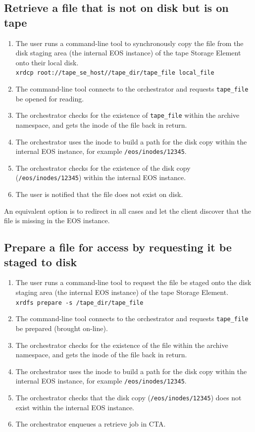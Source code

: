 \documentclass{article}
\begin{document}
\subsection{Retrieve a file that is not on disk but is on tape}
\begin{enumerate}
	\item The user runs a command-line tool to synchronously copy the file from the disk staging area (the internal EOS instance) of the tape Storage Element onto their local disk.\\
	\texttt{xrdcp root://tape\_se\_host//tape\_dir/tape\_file local\_file}
	\item The command-line tool connects to the orchestrator and requests \texttt{tape\_file} be opened for reading.
	\item The orchestrator checks for the existence of \texttt{tape\_file} within the archive namespace, and gets the inode of the file back in return.
	\item The orchestrator uses the inode to build a path for the disk copy within the internal EOS instance, for example \texttt{/eos/inodes/12345}.
	\item The orchestrator checks for the existence of the disk copy (\texttt{/eos/inodes/12345}) within the internal EOS instance.
	\item The user is notified that the file does not exist on disk.
\end{enumerate}

An equivalent option is to redirect in all cases and let the client discover that the file is missing in the EOS instance.

\subsection{Prepare a file for access by requesting it be staged to disk}
\begin{enumerate}
	\item The user runs a command-line tool to request the file be staged onto the disk staging area (the internal EOS instance) of the tape Storage Element. \\
	\texttt{xrdfs prepare -s /tape\_dir/tape\_file}
	\item The command-line tool connects to the orchestrator and requests \texttt{tape\_file} be prepared (brought on-line).
	\item The orchestrator checks for the existence of the file within the archive namespace, and gets the inode of the file back in return.
	\item The orchestrator uses the inode to build a path for the disk copy within the internal EOS instance, for example \texttt{/eos/inodes/12345}.
	\item The orchestrator checks that the disk copy (\texttt{/eos/inodes/12345}) does not exist within the internal EOS instance.
	\item The orchestrator enqueues a retrieve job in CTA.
\end{enumerate}
\end{document}
